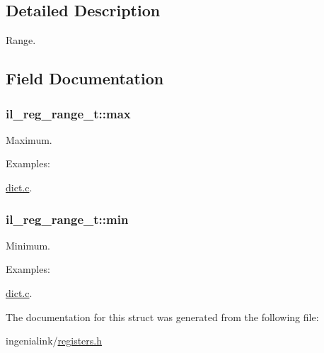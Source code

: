 \subsection{Detailed Description}
Range. 



\subsection{Field Documentation}
\subsubsection[{\texorpdfstring{max}{max}}]{ il\+\_\+reg\+\_\+range\+\_\+t\+::max}\hypertarget{structil__reg__range__t_aea6987fad601c38802c00a67027de135}{}\label{structil__reg__range__t_aea6987fad601c38802c00a67027de135}


Maximum. 

\begin{Desc}
\item[Examples\+: ]\par
\hyperlink{dict_8c-example}{dict.\+c}.\end{Desc}
\subsubsection[{\texorpdfstring{min}{min}}]{ il\+\_\+reg\+\_\+range\+\_\+t\+::min}\hypertarget{structil__reg__range__t_a5f2d3034108ba4f003dea87baaccf19c}{}\label{structil__reg__range__t_a5f2d3034108ba4f003dea87baaccf19c}


Minimum. 

\begin{Desc}
\item[Examples\+: ]\par
\hyperlink{dict_8c-example}{dict.\+c}.\end{Desc}


The documentation for this struct was generated from the following file\+:\begin{DoxyCompactItemize}
\item 
ingenialink/\hyperlink{registers_8h}{registers.\+h}\end{DoxyCompactItemize}
